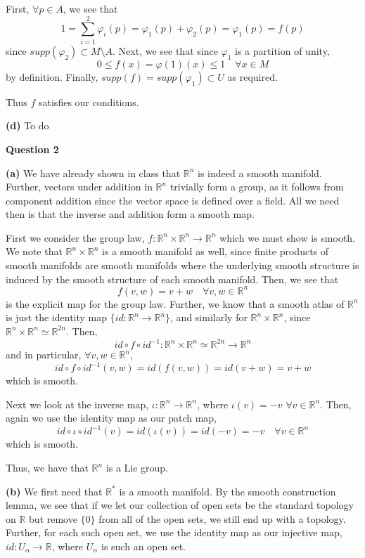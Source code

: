\documentclass[10pt]{article}
\newcommand{\R}{\mathbb{R}}
\begin{document}
First, $\forall p \in A$, we see that
$$1 = \sum_{i=1}^{2}\varphi_{i}(p) = \varphi_{1}(p) + \varphi_{2}(p) = \varphi_{1}(p) = f(p)$$
since $supp(\varphi_{2}) \subset M\setminus A$. Next, we see that since $\varphi_{1}$ is a partition of unity,
$$0 \leq f(x) = \varphi(1)(x) \leq 1 \hspace{1em} \forall x \in M$$
by definition. Finally, $supp(f) = supp(\varphi_{1}) \subset U$ as required.

Thus $f$ satisfies our conditions.

\textbf{(d)} To do

\newpage

\textbf{Question 2}

\textbf{(a)} We have already shown in class that $\R^{n}$ is indeed a smooth manifold. Further, vectors under addition in $\R^{n}$ trivially form a group, as it follows from component addition since the vector space is defined over a field. All we need then is that the inverse and addition form a smooth map.

First we consider the group law, $f: \R^{n} \times \R^{n} \to \R^{n}$ which we must show is smooth. We note that $\R^{n}\times \R^{n}$ is a smooth manifold as well, since finite products of smooth manifolds are smooth manifolds where the underlying smooth structure is induced by the smooth structure of each smooth manifold. Then, we see that
$$f(v,w) = v+w \hspace{1em} \forall v,w\in \R^{n}$$
is the explicit map for the group law. Further, we know that a smooth atlas of $\R^{n}$ is just the identity map $\{id: \R^{n} \to \R^{n}\}$, and similarly for $\R^{n}\times\R^{n}$, since $\R^{n}\times\R^{n} \simeq \R^{2n}$. Then,
$$id\circ f \circ id^{-1}: \R^{n}\times\R^{n} \simeq \R^{2n} \to \R^{n}$$
and in particular, $\forall v,w\in \R^{n}$,
$$id\circ f\circ id^{-1}(v,w) = id(f(v,w)) = id(v + w) = v+w$$
which is smooth.

Next we look at the inverse map, $\iota: \R^{n} \to \R^{n}$, where $\iota(v) = -v$ $\forall v\in \R^{n}$. Then, again we use the identity map as our patch map,
$$id\circ \iota \circ id^{-1}(v) = id(\iota(v)) = id(-v) = -v \hspace{1em} \forall v\in \R^{n}$$
which is smooth.

Thus, we have that $\R^{n}$ is a Lie group.

\textbf{(b)} We first need that $\R^{*}$ is a smooth manifold. By the smooth construction lemma, we see that if we let our collection of open sets be the standard topology on $\R$ but remove $\{0\}$ from all of the open sets, we still end up with a topology. Further, for each such open set, we use the identity map as our injective map, $id: U_{\alpha}\to \R$, where $U_{\alpha}$ is such an open set.
\end{document}
